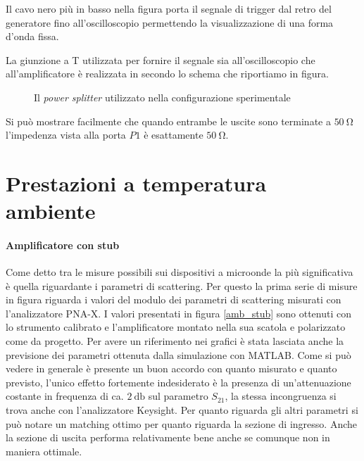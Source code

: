 \documentclass[12pt,oneside]{book}
\begin{document}
Il cavo nero più in basso nella figura porta il segnale di trigger dal retro del generatore fino all'oscilloscopio permettendo la visualizzazione di una forma d'onda fissa.

La giunzione a T utilizzata per fornire il segnale sia all'oscilloscopio che all'amplificatore è realizzata in secondo lo schema che riportiamo in figura.

\begin{figure}[!htbp]
    \centering
        
        \caption{Il \textit{power splitter} utilizzato nella configurazione sperimentale}
        \label{splitter_50}
\end{figure}

Si può mostrare facilmente che quando entrambe le uscite sono terminate a $\SI{50}{\ohm}$ l'impedenza vista alla porta $P1$ è esattamente $\SI{50}{\ohm}$.



\section{Prestazioni a temperatura ambiente}

\paragraph{Amplificatore con stub}

Come detto tra le misure possibili sui dispositivi a microonde la più significativa è quella riguardante i parametri di scattering. Per questo la prima serie di misure in figura riguarda i valori del modulo dei parametri di scattering misurati con l'analizzatore PNA-X. I valori presentati in figura \ref{amb_stub} sono ottenuti con lo strumento calibrato e l'amplificatore montato nella sua scatola e polarizzato come da progetto. Per avere un riferimento nei grafici è stata lasciata anche la previsione dei parametri ottenuta dalla simulazione con MATLAB. Come si può vedere in generale è presente un buon accordo con quanto misurato e quanto previsto, l'unico effetto fortemente indesiderato è la presenza di un'attenuazione costante in frequenza di ca. $\SI{2}{\decibel}$ sul parametro $S_{21}$, la stessa incongruenza si trova anche con l'analizzatore Keysight. Per quanto riguarda gli altri parametri si può notare un matching ottimo per quanto riguarda la sezione di ingresso. Anche la sezione di uscita performa relativamente bene anche se comunque non in maniera ottimale.
\end{document}
